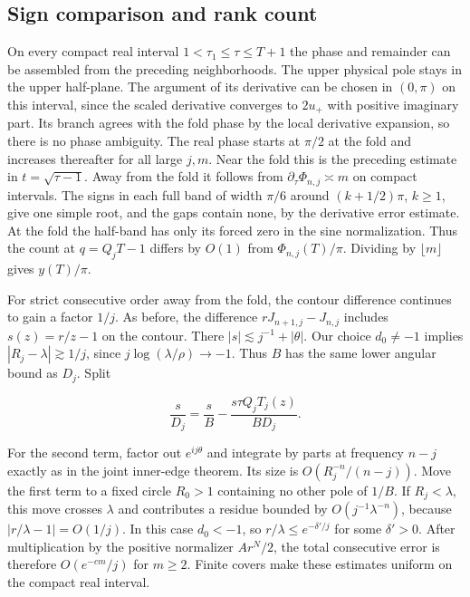 \documentclass[11pt]{article}
\begin{document}
\subsection{Sign comparison and rank count}
\label{sec:sign-comparison-and-rank-count}

On every compact real interval \(1<\tau_1\le\tau\le T+1\) the phase and remainder can be assembled from the preceding neighborhoods. The upper physical pole stays in the upper half-plane. The argument of its derivative can be chosen in \((0,\pi)\) on this interval, since the scaled derivative converges to \(2u_{+}\) with positive imaginary part. Its branch agrees with the fold phase by the local derivative expansion, so there is no phase ambiguity. The real phase starts at \(\pi/2\) at the fold and increases thereafter for all large \(j,m\). Near the fold this is the preceding estimate in \(t=\sqrt{\tau-1}\). Away from the fold it follows from \(\partial_\tau\Phi_{n,j}\asymp m\) on compact intervals. The signs in each full band of width \(\pi/6\) around \((k+1/2)\pi\), \(k\ge1\), give one simple root, and the gaps contain none, by the derivative error estimate. At the fold the half-band has only its forced zero in the sine normalization. Thus the count at \(q=Q_jT-1\) differs by \(O(1)\) from \(\Phi_{n,j}(T)/\pi\). Dividing by \(\lfloor m\rfloor\) gives \(y(T)/\pi\).

For strict consecutive order away from the fold, the contour difference continues to gain a factor \(1/j\). As before, the difference \(r J_{n+1,j}-J_{n,j}\) includes \(s(z)=r/z-1\) on the contour. There \(|s|\lesssim j^{-1}+|\theta|\). Our choice \(d_0\ne-1\) implies \(|R_j-\lambda|\gtrsim1/j\), since \(j\log(\lambda/\rho)\to-1\). Thus \(B\) has the same lower angular bound as \(D_j\). Split

\begin{equation*}
\frac{s}{D_j}=\frac{s}{B}-\frac{s\tau Q_j T_j(z)}{B D_j}.
\end{equation*}

For the second term, factor out \(e^{ij\theta}\) and integrate by parts at frequency \(n-j\) exactly as in the joint inner-edge theorem. Its size is \(O(R_j^{-n}/(n-j))\). Move the first term to a fixed circle \(R_0>1\) containing no other pole of \(1/B\). If \(R_j<\lambda\), this move crosses \(\lambda\) and contributes a residue bounded by \(O(j^{-1}\lambda^{-n})\), because \(|r/\lambda-1|=O(1/j)\). In this case \(d_0<-1\), so \(r/\lambda\le e^{-\delta'/j}\) for some \(\delta'>0\). After multiplication by the positive normalizer \(A r^N/2\), the total consecutive error is therefore \(O(e^{-c m}/j)\) for \(m\ge2\). Finite covers make these estimates uniform on the compact real interval.
\end{document}
